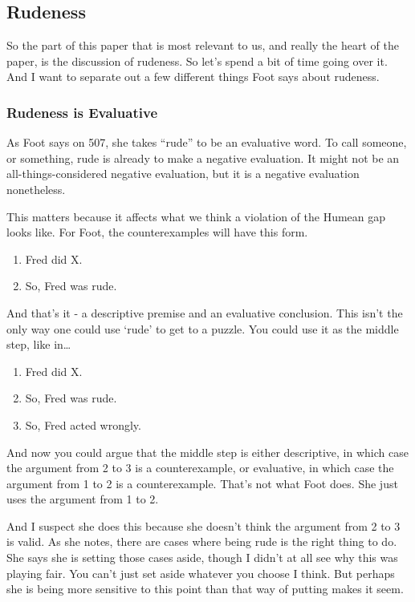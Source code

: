 \documentclass[
]{article}
\providecommand{\tightlist}{%
  \setlength{\itemsep}{0pt}\setlength{\parskip}{0pt}}
\begin{document}
\hypertarget{rudeness}{%
\subsection{Rudeness}\label{rudeness}}

So the part of this paper that is most relevant to us, and really the
heart of the paper, is the discussion of rudeness. So let's spend a bit
of time going over it. And I want to separate out a few different things
Foot says about rudeness.

\hypertarget{rudeness-is-evaluative}{%
\subsubsection{Rudeness is Evaluative}\label{rudeness-is-evaluative}}

As Foot says on 507, she takes ``rude'' to be an evaluative word. To
call someone, or something, rude is already to make a negative
evaluation. It might not be an all-things-considered negative
evaluation, but it is a negative evaluation nonetheless.

This matters because it affects what we think a violation of the Humean
gap looks like. For Foot, the counterexamples will have this form.

\begin{enumerate}
\def\labelenumi{\arabic{enumi}.}
\tightlist
\item
  Fred did X.
\item
  So, Fred was rude.
\end{enumerate}

And that's it - a descriptive premise and an evaluative conclusion. This
isn't the only way one could use `rude' to get to a puzzle. You could
use it as the middle step, like in\ldots{}

\begin{enumerate}
\def\labelenumi{\arabic{enumi}.}
\tightlist
\item
  Fred did X.
\item
  So, Fred was rude.
\item
  So, Fred acted wrongly.
\end{enumerate}

And now you could argue that the middle step is either descriptive, in
which case the argument from 2 to 3 is a counterexample, or evaluative,
in which case the argument from 1 to 2 is a counterexample. That's not
what Foot does. She just uses the argument from 1 to 2.

And I suspect she does this because she doesn't think the argument from
2 to 3 is valid. As she notes, there are cases where being rude is the
right thing to do. She says she is setting those cases aside, though I
didn't at all see why this was playing fair. You can't just set aside
whatever you choose I think. But perhaps she is being more sensitive to
this point than that way of putting makes it seem.
\end{document}
